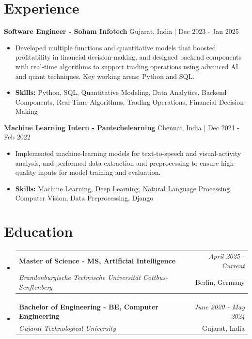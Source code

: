 \documentclass[a4paper,11pt]{article}
\makeatletter
\newcommand{\resumeSubheading}[4]{
\vspace{0.5mm}\item
    \begin{tabular*}{\linewidth}[t]{l@{\extracolsep{\fill}}r}
        \textbf{#1} & \textit{\footnotesize{#4}} \\
        \textit{\footnotesize{#3}} &  \footnotesize{#2}\\
    \end{tabular*}
    \vspace{-2.4mm}
}
\makeatother
\begin{document}
\section{\textbf{Experience}}


\vspace{1mm}
  \textbf{Software Engineer - Soham Infotech} \hfill Gujarat, India | Dec 2023 - Jan 2025
\vspace{-1.5mm} %
\begin{itemize}
  \item Developed multiple functions and quantitative models that boosted profitability in financial decision-making, and designed backend components with real-time algorithms to support trading operations using advanced AI and quant techniques. Key working areas: Python and SQL.

\vspace{-2mm}
  \item \textbf{Skills:} Python, SQL, Quantitative Modeling, Data Analytics, Backend Components, Real-Time Algorithms, Trading Operations, Financial Decision-Making
\end{itemize}

\vspace{1mm}
  \textbf{Machine Learning Intern - Pantechelearning} \hfill Chennai, India | Dec 2021 - Feb 2022
\vspace{-1.5mm} %
\begin{itemize}
  \item Implemented machine-learning models for text-to-speech and visual-activity analysis, and performed data extraction and preprocessing to ensure high-quality inputs for model training and evaluation.
\vspace{-2mm}
  \item \textbf{Skills:} Machine Learning, Deep Learning, Natural Language Processing, Computer Vision, Data Preprocessing, Django
\end{itemize}\section{\textbf{Education}}
\vspace{-0.4mm}

\begin{itemize}[leftmargin=0.15in, label={}]
\resumeSubheading
{Master of Science - MS, Artificial Intelligence }{Berlin, Germany}
{Brandenburgische Technische Universität Cottbus-Senftenberg  }{April 2025 - Current}

\vspace{1.0mm} %
\resumeSubheading
{Bachelor of Engineering - BE, Computer Engineering  }{Gujarat, India}
{Gujarat Technological University }{June 2020 - May 2024}

\end{itemize}
\end{document}
